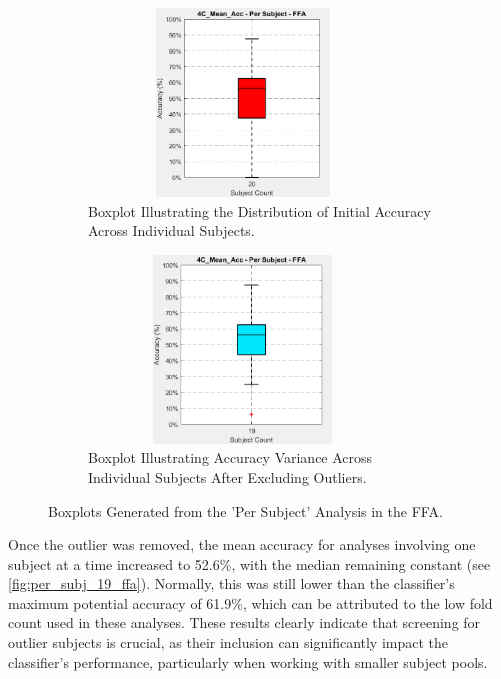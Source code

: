 \begin{figure}[htbp]
 	\centering
	\begin{subfigure}{0.49\textwidth}
		\centering
		\includegraphics[width = 0.9\textwidth, height = 5cm]{assets/images/per_subj_4C_20_ffa.png}
		\caption{Boxplot Illustrating the Distribution of Initial Accuracy Across Individual Subjects.}
		\label{fig:per_subj_all_ffa}
	\end{subfigure}
	\hfill
	\begin{subfigure}{0.49\textwidth}
		\centering
	 	\includegraphics[width = 0.9\textwidth, height = 5cm]{assets/images/per_subj_4C_19_ffa.png}
		\caption{Boxplot Illustrating Accuracy Variance Across Individual Subjects After Excluding Outliers.}
		\label{fig:per_subj_19_ffa}
	\end{subfigure}
	\caption[Individual Subjects' Accuracies Boxplots for the FFA]{Boxplots Generated from the 'Per Subject' Analysis in the \gls{FFA}.}
 	\label{fig:per_subj_ffa}
\end{figure}

Once the outlier was removed, the mean accuracy for analyses involving one subject at a time increased to 52.6\%, with the median remaining constant (see \autoref{fig:per_subj_19_ffa}). Normally, this was still lower than the classifier's maximum potential accuracy of 61.9\%, which can be attributed to the low fold count used in these analyses. These results clearly indicate that screening for outlier subjects is crucial, as their inclusion can significantly impact the classifier's performance, particularly when working with smaller subject pools.

